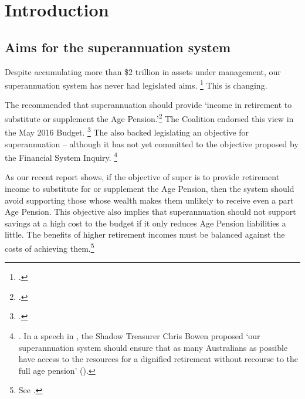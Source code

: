 \documentclass[continuous]{grattan}\usepackage[]{graphicx}\usepackage[]{color}
\begin{document}
\contentspage

\clearpage
\listoffigures
\clearpage

\chapter{Introduction}\label{chap:intro}
\section{Aims for the superannuation system}\label{aims-for-the-superannuation-system}
Despite accumulating more than \$2 trillion in assets under management, our superannuation system has never had legislated aims.%
\footcite{APRA2016-Annual-Superannuation-Bulletin-Jun2015} %
This is changing.

The \citeyear{FinancialSystemsInquiry2014}  recommended that superannuation should provide `income in retirement to substitute or supplement the Age Pension.'\footcites{FinancialSystemsInquiry2014}{DaleyCoatesWoodEtAl2015Super} %
The Coalition endorsed this view in the May 2016 Budget.%
\footcites[][5]{Budget-2016-17-Tax-Super}{Morrison-2016-A-more-sustainable-superannuation-system} %
The \ALP{} also backed legislating an objective for superannuation -- although it has not yet committed to the objective proposed by the Financial System Inquiry.%
\footnote{\textcite{Bowen-Objective-Super-2016}. In a speech in \citeyear{Bowen-June-2015-speech-to-committee-for-sustainable-retirement-incomes}, the Shadow Treasurer Chris Bowen proposed `our superannuation system should ensure that as many Australians as possible have access to the resources for a dignified retirement without recourse to the full age pension' 
(\textcite{Bowen-June-2015-speech-to-committee-for-sustainable-retirement-incomes}).}

As our recent  report shows, if the objective of super is to provide retirement income to substitute for or supplement the Age Pension, then the system should avoid supporting those whose wealth makes them unlikely to receive even a part Age Pension. %
This objective also implies that superannuation should not support savings at a high cost to the budget if it only reduces Age Pension liabilities a little. %
The benefits of higher retirement incomes must be balanced against the costs of achieving them.\footnote{See \textcite[][16]{DaleyCoatesWoodEtAl2015Super}.} 
\end{document}
